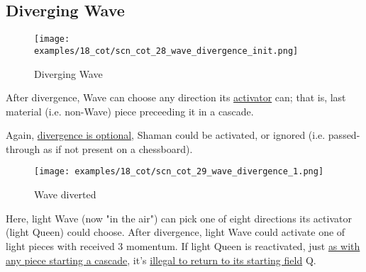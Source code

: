 \clearpage %

\subsection*{Diverging Wave}
\label{sec:Conquest of Tlalocan/Divergence/Diverging Wave}

\vspace*{-1.4\baselineskip}
\noindent
\begin{figure}[!h]
\texttt{[image: examples/18\_cot/scn\_cot\_28\_wave\_divergence\_init.png]}
\vspace*{-1.3\baselineskip}
\caption{Diverging Wave}
\label{fig:scn_cot_28_wave_divergence_init}
\end{figure}

\vspace*{-0.4\baselineskip}
After divergence, Wave can choose any direction its
\hyperref[fig:scn_mv_29_wave_cascading_steps]{activator} can; that is, last material
(i.e. non-Wave) piece preceeding it in a cascade.

Again, \hyperref[fig:scn_cot_09_own_shaman_is_divergent_init]{divergence is optional},
Shaman could be activated, or ignored (i.e. passed-through as if not present on a
chessboard).

\clearpage %

\vspace*{-2.1\baselineskip}
\noindent
\begin{figure}[!h]
\texttt{[image: examples/18\_cot/scn\_cot\_29\_wave\_divergence\_1.png]}
\vspace*{-1.3\baselineskip}
\caption{Wave diverted}
\label{fig:scn_cot_29_wave_divergence_1}
\end{figure}

\vspace*{-0.4\baselineskip}
Here, light Wave (now "in the air") can pick one of eight directions its activator
(light Queen) could choose. After divergence, light Wave could activate one of light
pieces with received 3 momentum. If light Queen is reactivated, just
\hyperref[fig:scn_mv_46_static_move_is_illegal_init]{as with any piece starting a cascade}, it's
\hyperref[fig:scn_cot_10_own_shaman_is_divergent_end]{illegal to return to its starting field} Q.

